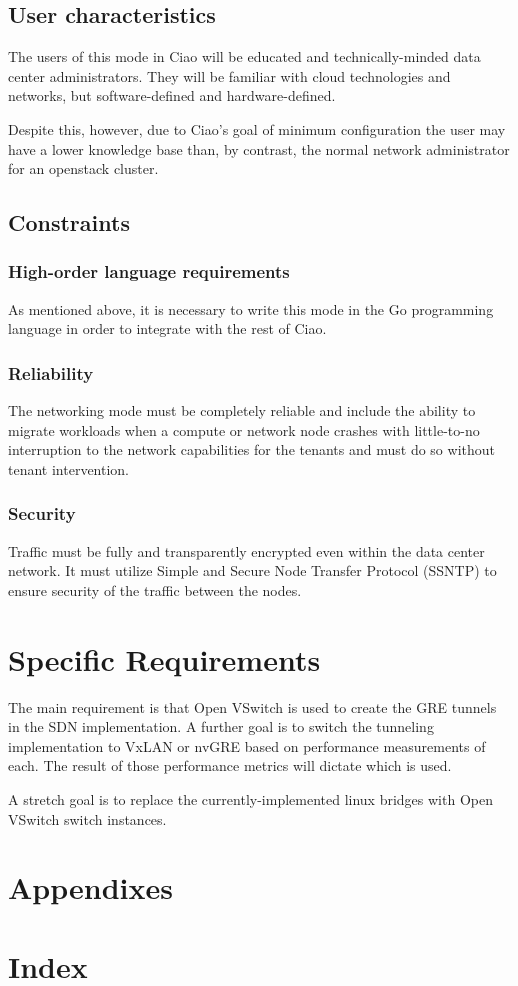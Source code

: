 \documentclass[10pt,letterpaper,onecolumn,draftclsnofoot]{IEEEtran}
\begin{document}
\subsection{User characteristics}

The users of this mode in Ciao will be educated and technically-minded data
center administrators. They will be familiar with cloud technologies and
networks, but software-defined and hardware-defined.

Despite this, however, due to Ciao's goal of minimum configuration the user may
have a lower knowledge base than, by contrast, the normal network administrator
for an openstack cluster.

\subsection{Constraints}

\subsubsection{High-order language requirements}

As mentioned above, it is necessary to write this mode in the Go programming
language in order to integrate with the rest of Ciao.

\subsubsection{Reliability}

The networking mode must be completely reliable and include the ability to
migrate workloads when a compute or network node crashes with little-to-no
interruption to the network capabilities for the tenants and must do so without
tenant intervention.

\subsubsection{Security}

Traffic must be fully and transparently encrypted even within the data center
network. It must utilize Simple and Secure Node Transfer Protocol (SSNTP) to
ensure security of the traffic between the nodes.

\section{Specific Requirements}

The main requirement is that Open VSwitch is used to create the GRE tunnels in
the SDN implementation. A further goal is to switch the tunneling implementation
to VxLAN or nvGRE based on performance measurements of each. The result of those
performance metrics will dictate which is used.

A stretch goal is to replace the currently-implemented linux bridges with
Open VSwitch switch instances.

\clearpage
\section{Appendixes}

\section{Index}
\end{document}
